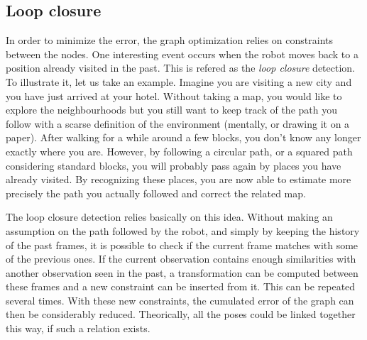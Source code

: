 \clearpage
\subsection{Loop closure}

In order to minimize the error, the graph optimization relies on constraints between the nodes. One interesting event occurs when the robot moves back to a position already visited in the past. This is refered as the \emph{loop closure} detection. To illustrate it, let us take an example. Imagine you are visiting a new city and you have just arrived at your hotel. Without taking a map, you would like to explore the neighbourhoods but you still want to keep track of the path you follow with a scarse definition of the environment (mentally, or drawing it on a paper). After walking for a while around a few blocks, you don't know any longer exactly where you are. However, by following a circular path, or a squared path considering standard blocks, you will probably pass again by places you have already visited. By recognizing these places, you are now able to estimate more precisely the path you actually followed and correct the related map.

The loop closure detection relies basically on this idea. Without making an assumption on the path followed by the robot, and simply by keeping the history of the past frames, it is possible to check if the current frame matches with some of the previous ones. If the current observation contains enough similarities with another observation seen in the past, a transformation can be computed between these frames and a new constraint can be inserted from it. This can be repeated several times. With these new constraints, the cumulated error of the graph can then be considerably reduced. Theorically, all the poses could be linked together this way, if such a relation exists. 


